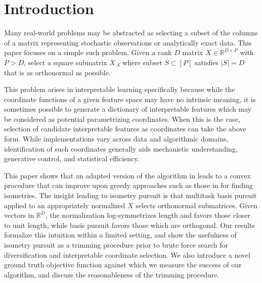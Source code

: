 \section{Introduction}
\label{sec:introduction}

Many real-world problems may be abstracted as selecting a subset of the columns of a matrix representing stochastic observations or analytically exact data.
This paper focuses on a simple such problem.
Given a rank $D$ matrix $ X \in \mathbb R^{D \times P}$ with $P > D$, select a square submatrix $ X_{. S}$ where subset $ S \subset [P]$ satisfies $| S| = D$ that is as orthonormal as possible.

This problem arises in interpretable learning specifically because while the coordinate functions of a given feature space may have no intrinsic meaning, it is sometimes possible to generate a dictionary of interpretable features which may be considered as potential parametrizing coordinates.
When this is the case, selection of candidate interpretable features as coordinates can take the above form.
While implementations vary across data and algorithmic domains, identification of such coordinates generally aids mechanistic understanding, generative control, and statistical efficiency.

This paper shows that an adapted version of the algorithm in \citet{Koelle2024-no} leads to a convex procedure that can improve upon greedy approaches such as those in \citet{5895106, NEURIPS2019_6a10bbd4, Kohli2021-lr, Jones2007-uc} for finding isometries.
The insight leading to isometry pursuit is that multitask basis pursuit applied to an appropriately normalized $ X$ selects orthonormal submatrices.
Given vectors in $\mathbb R^D$, the normalization log-symmetrizes length and favors those closer to unit length, while basis pursuit favors those which are orthogonal.
Our results formalize this intuition within a limited setting, and show the usefulness of isometry pursuit as a trimming procedure prior to brute force search for diversification and interpretable coordinate selection.
We also introduce a novel ground truth objective function against which we measure the success of our algorithm, and discuss the reasonableness of the trimming procedure.

